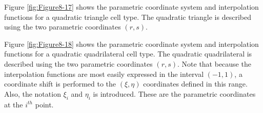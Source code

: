 \begin{description}[leftmargin=0cm,labelindent=0cm]
    \item[Quadratic Triangle.\index{interpolation function!quadratic triangle}] Figure \ref{fig:Figure8-17} shows the parametric coordinate system and interpolation functions for a quadratic triangle cell type. The quadratic triangle is described using the two parametric coordinates $(r,s)$.

    \item[Quadratic Quadrilateral.\index{interpolation function!quadratic quadrilateral}] Figure \ref{fig:Figure8-18} shows the parametric coordinate system and interpolation functions for a quadratic quadrilateral cell type. The quadratic quadrilateral is described using the two parametric coordinates $(r,s)$. Note that because the interpolation functions are most easily expressed in the interval $(-1,1)$, a coordinate shift is performed to the $(\xi, \eta)$ coordinates defined in this range. Also, the notation $\xi_i$ and $\eta_i$ is introduced. These are the parametric coordinates at the $i^{th}$ point.


\end{description}
